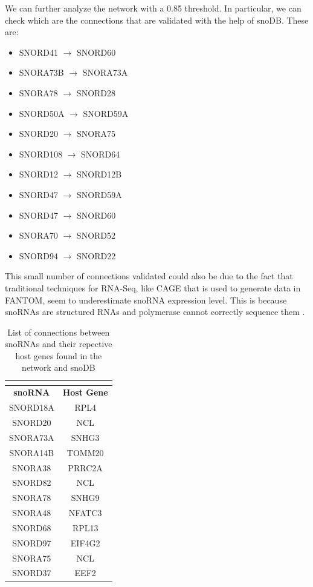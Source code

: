 \documentclass[journal]{IEEEtran}
\begin{document}
We can further analyze the network with a 0.85 threshold. In particular, we can check which are the connections that are validated with the help of snoDB. These are:
\begin{itemize}
    \item SNORD41 $\rightarrow$ SNORD60
    \item SNORA73B $\rightarrow$ SNORA73A
    \item SNORA78 $\rightarrow$ SNORD28
    \item SNORD50A $\rightarrow$ SNORD59A
    \item SNORD20 $\rightarrow$ SNORA75
    \item SNORD108 $\rightarrow$ SNORD64
    \item SNORD12 $\rightarrow$ SNORD12B
    \item SNORD47 $\rightarrow$ SNORD59A
    \item SNORD47 $\rightarrow$ SNORD60
    \item SNORA70 $\rightarrow$ SNORD52
    \item SNORD94 $\rightarrow$ SNORD22
\end{itemize}
This small number of connections validated could also be due to the fact that traditional techniques for RNA-Seq, like CAGE that is used to generate data in FANTOM, seem to underestimate snoRNA expression level. This is because snoRNAs are structured RNAs and polymerase cannot correctly sequence them \cite{pmid34088344}.

\begin{table}[!ht]
    \centering
    \begin{tabular}{|c|c|}
    \multicolumn{1}{c}{} \\ \hline 
       \textbf{snoRNA} & \textbf{Host Gene}   \\ \hline 
        
        SNORD18A & RPL4 \\ \hline
        SNORD20 & NCL \\ \hline
        SNORA73A & SNHG3 \\ \hline
        SNORA14B & TOMM20 \\ \hline
        SNORA38 & PRRC2A \\ \hline
        SNORD82 & NCL\\ \hline
        SNORA78 & SNHG9 \\ \hline
        SNORA48 & NFATC3\\ \hline
        SNORD68 & RPL13 \\ \hline
        SNORD97 & EIF4G2 \\ \hline
        SNORA75 & NCL \\ \hline
        SNORD37 & EEF2\\ \hline
        \end{tabular}
        \caption{List of connections between snoRNAs and their repective host genes found in the network and snoDB}\label{table:sno-host-connections}
\end{table}
\end{document}
